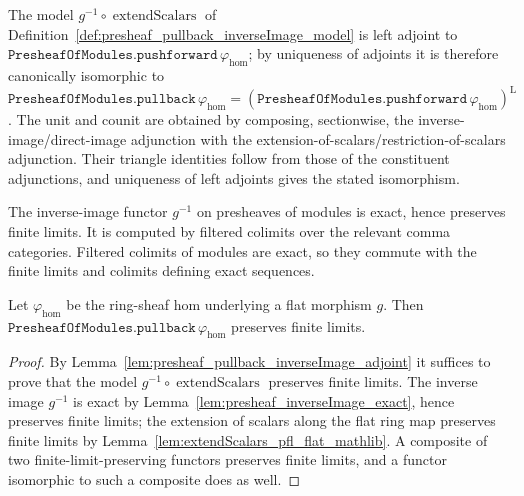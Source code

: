 \begin{lemma}
  \label{lem:presheaf_pullback_inverseImage_adjoint}
  The model \(g^{-1} \circ \operatorname{extendScalars}\) of
  Definition~\ref{def:presheaf_pullback_inverseImage_model} is left adjoint to
  \(\texttt{PresheafOfModules.pushforward}\,\varphi_{\mathrm{hom}}\); by uniqueness of
  adjoints it is therefore canonically isomorphic to
  \(\texttt{PresheafOfModules.pullback}\,\varphi_{\mathrm{hom}}
  = (\texttt{PresheafOfModules.pushforward}\,\varphi_{\mathrm{hom}})^{\mathrm{L}}\).
  The unit and counit are obtained by composing, sectionwise, the
  inverse-image/direct-image adjunction with the extension-of-scalars/restriction-of-scalars
  adjunction. Their triangle identities follow from those of the constituent
  adjunctions, and uniqueness of left adjoints gives the stated isomorphism.
\end{lemma}

\begin{lemma}
  \label{lem:presheaf_inverseImage_exact}
  The inverse-image functor \(g^{-1}\) on presheaves of modules is exact, hence
  preserves finite limits. It is computed by filtered colimits over the relevant comma
  categories. Filtered colimits of modules are exact, so they commute with the finite
  limits and colimits defining exact sequences.
\end{lemma}

\begin{lemma}
  \label{lem:presheaf_pullback_pfl_flat}
  Let \(\varphi_{\mathrm{hom}}\) be the ring-sheaf hom underlying a flat morphism
  \(g\). Then \(\texttt{PresheafOfModules.pullback}\,\varphi_{\mathrm{hom}}\) preserves
  finite limits.
\end{lemma}

\begin{proof}
  By Lemma~\ref{lem:presheaf_pullback_inverseImage_adjoint} it suffices to prove that
  the model \(g^{-1} \circ \operatorname{extendScalars}\) preserves finite limits. The
  inverse image \(g^{-1}\) is exact by
  Lemma~\ref{lem:presheaf_inverseImage_exact}, hence preserves finite limits; the
  extension of scalars along the flat ring map preserves finite limits by
  Lemma~\ref{lem:extendScalars_pfl_flat_mathlib}. A composite of two
  finite-limit-preserving functors preserves finite limits, and a functor isomorphic
  to such a composite does as well.
\end{proof}

